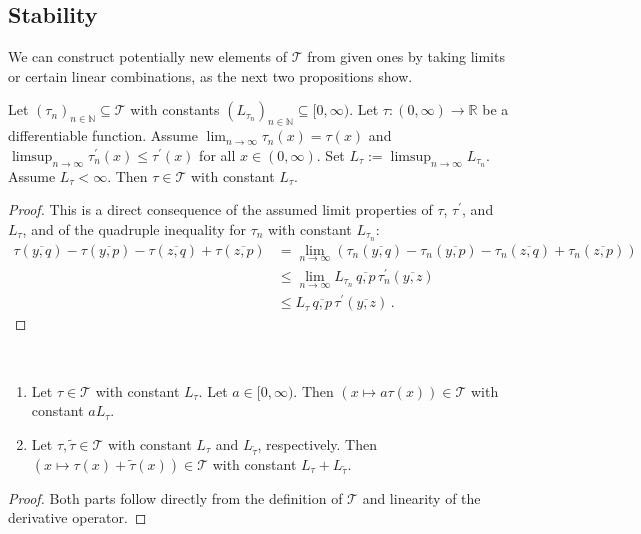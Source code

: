 \documentclass{article}
\renewcommand{\subset}{\subseteq}
\newcommand{\lb}{\left(} %
\newcommand{\rb}{\right)} %
\newcommand{\br}[1]{\lb #1 \rb} %
\newcommand*{\mc}[1]{\mathcal{#1}}
\newcommand{\N}{\mathbb{N}}
\newcommand{\R}{\mathbb{R}}
\newcommand{\Rp}{[0, \infty)} %
\newcommand{\Rpp}{(0, \infty)} %
\newcommand{\pr}{^\prime}
\newcommand{\equationFullstop}{\, .}
\newcommand{\eqfs}{\equationFullstop}
\newcommand{\ol}[2]{\overline{#1,#2}}
\newcommand{\tran}{\tau}
\newcommand{\Tran}{\mc{T}}
\newcommand{\dtran}{\tran\pr}
\newcommand{\ctransymbol}{L}
\newcommand{\ctrano}[1]{\ctransymbol_{#1}}
\newcommand{\ctran}{\ctrano{\tran}}
\begin{document}
\subsection{Stability}\label{ssec:quad:stabi}
%
We can construct potentially new elements of $\Tran$ from given ones by taking limits or certain linear combinations, as the next two propositions show.
%
\begin{proposition}\label{lmm:quad:limit}
	Let $(\tran_n)_{n\in\N}\subset\Tran$ with constants $(\ctrano{\tran_n})_{n\in\N}\subset\Rp$. Let $\tran\colon\Rpp\to\R$ be a differentiable function. Assume $\lim_{n\to\infty}\tran_n(x) = \tran(x)$ and $\limsup_{n\to\infty} \dtran_n(x) \leq \dtran(x)$ for all $x\in\Rpp$. Set $\ctran := \limsup_{n\to\infty} \ctrano{\tran_n}$. Assume $\ctran < \infty$. Then $\tran\in\Tran$ with constant $\ctran$.
\end{proposition}
%
\begin{proof}
	This is a direct consequence of the assumed limit properties of $\tran$, $\dtran$, and $\ctran$, and of the quadruple inequality for $\tran_n$ with constant $\ctrano{\tran_n}$:
	\begin{align*}
		\tran(\ol yq) - \tran(\ol yp) - \tran(\ol zq) + \tran(\ol zp)
		&=
		\lim_{n\to\infty}
		\br{\tran_n(\ol yq) - \tran_n(\ol yp) - \tran_n(\ol zq) + \tran_n(\ol zp)}
		\\&\leq
		\lim_{n\to\infty}
		\ctrano{\tran_n}\,\ol qp\, \dtran_n(\ol yz)
		\\&\leq
		\ctran \,\ol qp\, \dtran(\ol yz)
		\eqfs
	\end{align*}
\end{proof}
%
\begin{proposition}\label{lmm:quadstablin}\mbox{ }
	\begin{enumerate}[label=(\roman*)]
		\item\label{lmm:quadstablin:factor} Let $\tran\in\Tran$ with constant $\ctran$. Let $a\in\Rp$. Then $(x\mapsto a\tran(x)) \in \Tran$ with constant $a\ctran$.
		\item\label{lmm:quadstablin:add} Let $\tran, \tilde \tran\in \Tran$ with constant $\ctrano{\tran}$ and $\ctrano{\tilde\tran}$, respectively. Then $(x\mapsto \tran(x)+\tilde\tran(x)) \in \Tran$ with constant  $\ctrano{\tran} + \ctrano{\tilde\tran}$.
	\end{enumerate}
\end{proposition}
%
\begin{proof}
	Both parts follow directly from the definition of $\Tran$ and linearity of the derivative operator.
\end{proof}
%
%
\end{document}
